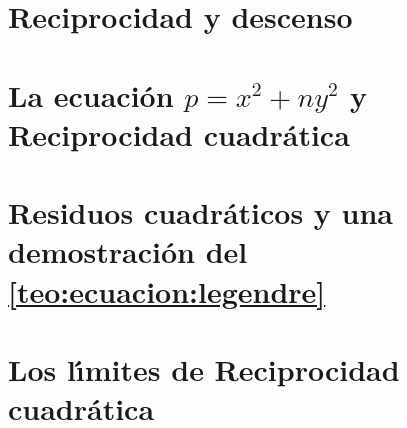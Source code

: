 \section{Reciprocidad y descenso}\label{sec:fermat}


\section{La ecuaci\'on $p=x^2+ny^2$ y Reciprocidad cuadr\'atica}%
	\label{sec:ecuacion}


\section{Residuos cuadr\'aticos y una demostraci\'on del \teoname~%
	\ref{teo:ecuacion:legendre}}%
	\label{sec:residuos}


\section{Los l\'{\i}mites de Reciprocidad cuadr\'atica}%
	\label{sec:limitaciones}


